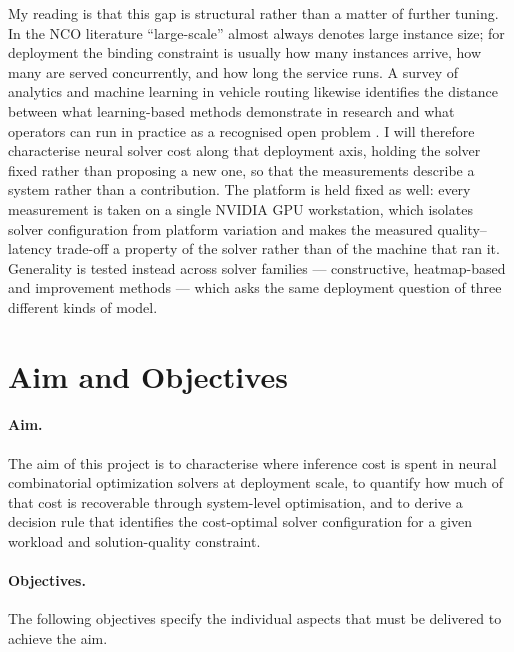 \documentclass[11pt,a4paper]{article}
\begin{document}
My reading is that this gap is structural rather than a matter of further tuning.
In the NCO literature ``large-scale'' almost always denotes large instance size;
for deployment the binding constraint is usually how many instances arrive, how
many are served concurrently, and how long the service runs. A survey of analytics
and machine learning in vehicle routing likewise identifies the distance between
what learning-based methods demonstrate in research and what operators can run in
practice as a recognised open problem \citep{bai2023analytics}. I will therefore
characterise neural solver cost along that deployment axis, holding the solver
fixed rather than proposing a new one, so that the measurements describe a system
rather than a contribution. The platform is held fixed as well: every measurement
is taken on a single NVIDIA GPU workstation, which isolates solver configuration
from platform variation and makes the measured quality--latency trade-off a
property of the solver rather than of the machine that ran it. Generality is
tested instead across solver families --- constructive, heatmap-based and
improvement methods --- which asks the same deployment question of three different
kinds of model.

\section{Aim and Objectives}

\paragraph{Aim.} The aim of this project is to characterise where inference cost
is spent in neural combinatorial optimization solvers at deployment scale, to
quantify how much of that cost is recoverable through system-level optimisation,
and to derive a decision rule that identifies the cost-optimal solver
configuration for a given workload and solution-quality constraint.

\paragraph{Objectives.} The following objectives specify the individual aspects
that must be delivered to achieve the aim.
\end{document}
